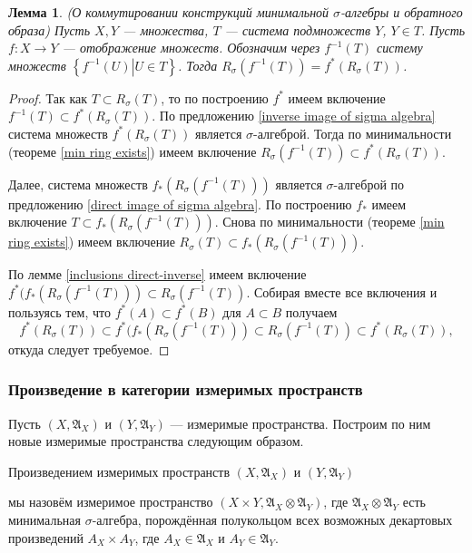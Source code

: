 \documentclass[12pt]{article}
\newtheorem{lemma}[theorem]{Лемма}
\numberwithin{theorem}{section}
\theoremstyle{definition}
\newcommand{\defin}[2]{\hypertarget{#2}{{\color{red} #1}}}
\newcommand{\setsigmaalg}{\mathfrak{A}}
\newcommand{\defineset}[2]{\left\{
	\left.
	#1
	\right\vert
	#2
	\right\}}
\begin{document}
	\begin{lemma} (О коммутировании конструкций минимальной $ \sigma $-алгебры и обратного образа) \label{inverse image and min sigma-algebra}
		Пусть $ X, Y $ --- множества, $ T $ --- система подмножеств $ Y $, $ Y \in T $.
		Пусть $ f \colon X \to Y $ --- отображение множеств.
		Обозначим через $ f^{-1}(T) $ систему множеств $ \defineset{f^{-1}(U)}{U \in T} $.
		Тогда $ R_{\sigma}(f^{-1}(T)) = f^{*}(R_{\sigma}(T)) $.
	\end{lemma}
	
	\begin{proof}
		Так как $ T \subset R_{\sigma}(T) $, то по построению $ f^* $ имеем включение $ f^{-1}(T) \subset f^*(R_{\sigma}(T)) $.
		По предложению \ref{inverse image of sigma algebra} система множеств $ f^*(R_{\sigma}(T)) $ является $ \sigma $-алгеброй.
		Тогда по минимальности (теореме \ref{min ring exists}) 
		имеем включение $ R_{\sigma}(f^{-1}(T)) \subset f^{*}(R_{\sigma}(T)) $.
		
		Далее, система множеств $ f_*(R_{\sigma}(f^{-1}(T))) $ является $ \sigma $-алгеброй по предложению
		\ref{direct image of sigma algebra}. По построению $ f_* $ имеем включение $ T \subset f_*(R_{\sigma}(f^{-1}(T))) $.
		Снова по минимальности (теореме \ref{min ring exists}) имеем включение $ R_{\sigma}(T) \subset f_*(R_{\sigma}(f^{-1}(T))) $.
		
		По лемме \ref{inclusions direct-inverse} имеем включение $ f^*(f_*(R_{\sigma}(f^{-1}(T))) \subset R_{\sigma}(f^{-1}(T)) $.
		Собирая вместе все включения и пользуясь тем, что $ f^*(A) \subset f^*(B) $ для $ A \subset B $ получаем
		$$ f^*(R_{\sigma}(T)) \subset f^*(f_*(R_{\sigma}(f^{-1}(T))) \subset R_{\sigma}(f^{-1}(T)) \subset f^{*}(R_{\sigma}(T)), $$
		откуда следует требуемое.
	\end{proof}
	
	\subsubsection{Произведение в категории измеримых пространств}
	
	Пусть $ (X, \setsigmaalg_X) $ и $ (Y, \setsigmaalg_Y) $ --- измеримые пространства.
	Построим по ним новые измеримые пространства следующим образом.
	
	\defin{Произведением измеримых пространств $ (X, \setsigmaalg_X) $ и $ (Y, \setsigmaalg_Y) $}{product-of-measurable-spaces}
	мы назовём измеримое пространство $ (X \times Y, \setsigmaalg_X \otimes \setsigmaalg_Y) $,
	где $ \setsigmaalg_X \otimes \setsigmaalg_Y $ есть минимальная $ \sigma $-алгебра, порождённая полукольцом
	всех возможных декартовых произведений $ A_X \times A_Y $,
	где $ A_X \in \setsigmaalg_X $ и $ A_Y \in \setsigmaalg_Y $.
	
\end{document}
